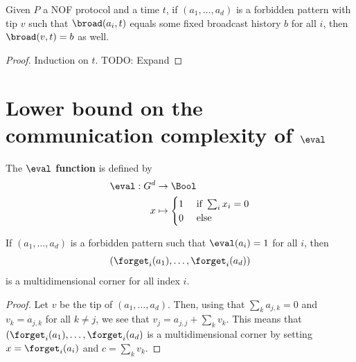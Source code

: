 \begin{lemma}
  \label{lem:mono-forbidden-pattern-tip}
  \leanok

  Given $P$ a NOF protocol and a time $t$, if $(a_1, \dots, a_d)$ is a forbidden pattern with tip $v$ such that $\broad(a_i, t)$ equals some fixed broadcast history $b$ for all $i$, then $\broad(v, t) = b$ as well.
\end{lemma}
\begin{proof}
  \leanok

  Induction on $t$. TODO: Expand
\end{proof}


\chapter{Lower bound on the communication complexity of \texorpdfstring{$\eval$}{eval}}

\begin{definition}
  \label{def:eval}
  \leanok

  The {\bf $\eval$ function} is defined by
  \begin{align}
      \eval : G^d & \to \Bool \\
      x & \mapsto \begin{cases}
      1 & \text{ if } \sum_i x_i = 0 \\
      0 & \text{ else}
    \end{cases}
  \end{align}
\end{definition}

\begin{lemma}
  \label{lem:forbidden-pattern-project-multicorner}
  \leanok

  If $(a_1, \dots, a_d)$ is a forbidden pattern such that $\eval(a_i) = 1$ for all $i$, then
  $$(\forget_i(a_1), \dots, \forget_i(a_d))$$
  is a multidimensional corner for all index $i$.
\end{lemma}
\begin{proof}
  \uses{}
  \leanok
  Let $v$ be the tip of $(a_1, \dots, a_d)$. Then, using that $\sum_k a_{j, k} = 0$ and $v_k = a_{j, k}$ for all $k \ne j$, we see that $v_j = a_{j, j} + \sum_k v_k$. This means that $(\forget_i(a_1), \dots, \forget_i(a_d)$ is a multidimensional corner by setting $x = \forget_i(a_i)$ and $c = \sum_k v_k$.
\end{proof}

